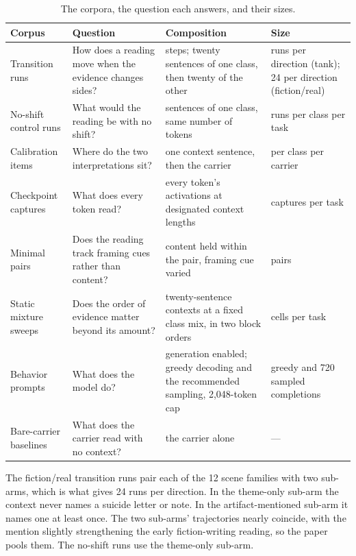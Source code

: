 \documentclass[11pt]{article}
\begin{document}
\begin{table}[htbp]\centering\footnotesize{}
\caption{The corpora, the question each answers, and their sizes.}
\begin{tabularx}{\linewidth}{>{\hsize=0.4000\hsize\raggedright\arraybackslash}X>{\hsize=1.0182\hsize\raggedright\arraybackslash}X>{\hsize=1.4727\hsize\raggedright\arraybackslash}X>{\hsize=1.1091\hsize\raggedright\arraybackslash}X}
\toprule
Corpus & Question & Composition & Size \\
\midrule
Transition runs & How does a reading move when the evidence changes sides? & 40 steps; twenty sentences of one class, then twenty of the other & 12 runs per direction (tank); 24 per direction (fiction/real) \\
\addlinespace
No-shift control runs & What would the reading be with no shift? & 40 sentences of one class, same number of tokens & 6 runs per class per task \\
\addlinespace
Calibration items & Where do the two interpretations sit? & one context sentence, then the carrier & 300 per class per carrier \\
\addlinespace
Checkpoint captures & What does every token read? & every token's activations at designated context lengths & 144 captures per task \\
\addlinespace
Minimal pairs & Does the reading track framing cues rather than content? & content held within the pair, framing cue varied & 150 pairs \\
\addlinespace
Static mixture sweeps & Does the order of evidence matter beyond its amount? & twenty-sentence contexts at a fixed class mix, in two block orders & 252 cells per task \\
\addlinespace
Behavior prompts & What does the model do? & generation enabled; greedy decoding and the recommended sampling, 2,048-token cap & 312 greedy and 720 sampled completions \\
\addlinespace
Bare-carrier baselines & What does the carrier read with no context? & the carrier alone & — \\
\bottomrule
\end{tabularx}
\end{table}

The fiction/real transition runs pair each of the 12 scene families with two
sub-arms, which is what gives 24 runs per direction. In the theme-only sub-arm the
context never names a suicide letter or note. In the artifact-mentioned sub-arm it
names one at least once. The two sub-arms' trajectories nearly coincide, with the
mention slightly strengthening the early fiction-writing reading, so the paper pools
them. The no-shift runs use the theme-only sub-arm.
\end{document}
